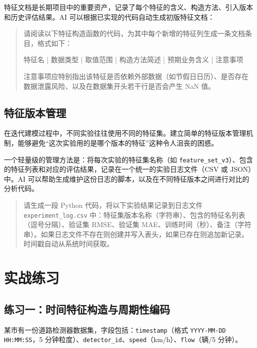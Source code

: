 特征文档是长期项目中的重要资产，记录了每个特征的含义、构造方法、引入版本和历史评估结果。AI 可以根据已实现的代码自动生成初版特征文档：

\begin{quote}
请阅读以下特征构造函数的代码，为其中每个新增的特征列生成一条文档条目，格式如下：

特征名 | 数据类型 | 取值范围 | 构造方法简述 | 预期业务含义 | 注意事项

注意事项应特别指出该特征是否依赖外部数据（如节假日日历）、是否存在数据泄露风险、以及在数据集开头若干行是否会产生 NaN 值。
\end{quote}

\subsection{特征版本管理}

在迭代建模过程中，不同实验往往使用不同的特征集。建立简单的特征版本管理机制，能够避免“这次实验用的是哪个版本的特征”这种令人沮丧的困惑。

一个轻量级的管理方法是：将每次实验的特征集名称（如 \texttt{feature\_set\_v3}）、包含的特征列表和对应的评估结果，记录在一个统一的实验日志文件（CSV 或 JSON）中。AI 可以帮助生成维护这份日志的脚本，以及在不同特征版本之间进行对比的分析代码。

\begin{quote}
请生成一段 Python 代码，将以下实验结果记录到日志文件 \texttt{experiment\_log.csv} 中：特征集版本名称（字符串）、包含的特征名列表（逗号分隔）、验证集 RMSE、验证集 MAE、训练时间（秒）、备注（字符串）。如果日志文件不存在则创建并写入表头，如果已存在则追加新记录。时间戳自动从系统时间获取。
\end{quote}


\section{实战练习}

\subsection*{练习一：时间特征构造与周期性编码}

某市有一份道路检测器数据集，字段包括：\texttt{timestamp}（格式 \texttt{YYYY-MM-DD HH:MM:SS}，5 分钟粒度）、\texttt{detector\_id}、\texttt{speed}（km/h）、\texttt{flow}（辆/5 分钟）。

